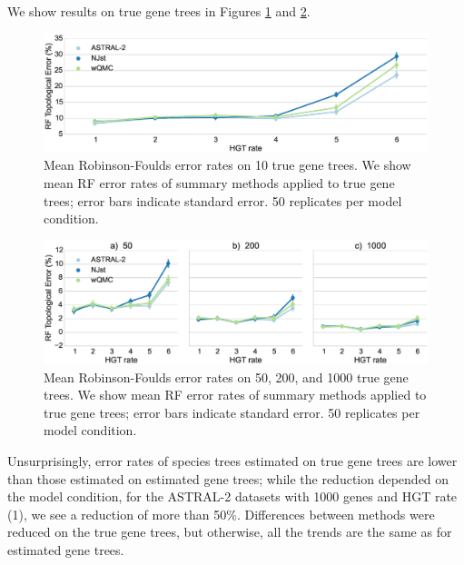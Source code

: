 We show results on true gene trees in Figures \ref{hgt::fig5} and
\ref{hgt::fig6}.
  \begin{figure}[h!]
 \includegraphics[width=\textwidth]{hgt-figs/10-true.eps}
 \caption[Mean Robinson-Foulds error rates on 10 true gene trees]{{Mean Robinson-Foulds error rates on 10 true gene trees}. We show
mean RF error rates of summary
methods applied to true gene trees;  error bars indicate standard error. 50
replicates per model condition.}
\label{hgt::fig5}
      \end{figure}
  \begin{figure}[h!]
 \includegraphics[width=\textwidth]{hgt-figs/more-true-row.eps}
 \caption[Mean Robinson-Foulds error  rates on 50, 200, 
and 1000 true gene trees]{{Mean Robinson-Foulds error  rates on 50, 200, 
and 1000 true gene trees}. We show
mean RF error rates of summary
methods applied to true gene trees; error bars indicate standard error. 
50 replicates per model condition.}
\label{hgt::fig6}
      \end{figure}
Unsurprisingly, error rates of species trees estimated on true gene trees are lower than those estimated on estimated gene trees;
while the reduction
depended on the model condition,  for the ASTRAL-2 datasets
with 1000 genes and HGT rate (1), we see a reduction of more than 50\%.    
Differences between methods were reduced on the true gene trees, but
otherwise, all the trends are the same as for estimated gene trees.
 
